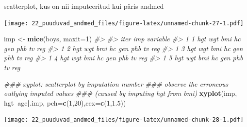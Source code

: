 \documentclass[]{book}
\newenvironment{Shaded}{\begin{snugshade}}{\end{snugshade}}
\newcommand{\CommentTok}[1]{\textcolor[rgb]{0.56,0.35,0.01}{\textit{#1}}}
\newcommand{\DataTypeTok}[1]{\textcolor[rgb]{0.13,0.29,0.53}{#1}}
\newcommand{\DecValTok}[1]{\textcolor[rgb]{0.00,0.00,0.81}{#1}}
\newcommand{\FloatTok}[1]{\textcolor[rgb]{0.00,0.00,0.81}{#1}}
\newcommand{\KeywordTok}[1]{\textcolor[rgb]{0.13,0.29,0.53}{\textbf{#1}}}
\newcommand{\NormalTok}[1]{#1}
\newcommand{\OperatorTok}[1]{\textcolor[rgb]{0.81,0.36,0.00}{\textbf{#1}}}
\newcommand{\StringTok}[1]{\textcolor[rgb]{0.31,0.60,0.02}{#1}}
\begin{document}
scatterplot, kus on nii imputeeritud kui päris andmed

\begin{Shaded}
\end{Shaded}

\texttt{[image: 22\_puuduvad\_andmed\_files/figure-latex/unnamed-chunk-27-1.pdf]}

\begin{Shaded}
\begin{Highlighting}[]
\NormalTok{imp <-}\StringTok{ }\KeywordTok{mice}\NormalTok{(boys, }\DataTypeTok{maxit=}\DecValTok{1}\NormalTok{)}
\CommentTok{#> }
\CommentTok{#>  iter imp variable}
\CommentTok{#>   1   1  hgt  wgt  bmi  hc  gen  phb  tv  reg}
\CommentTok{#>   1   2  hgt  wgt  bmi  hc  gen  phb  tv  reg}
\CommentTok{#>   1   3  hgt  wgt  bmi  hc  gen  phb  tv  reg}
\CommentTok{#>   1   4  hgt  wgt  bmi  hc  gen  phb  tv  reg}
\CommentTok{#>   1   5  hgt  wgt  bmi  hc  gen  phb  tv  reg}

\CommentTok{### xyplot: scatterplot by imputation number}
\CommentTok{### observe the erroneous outlying imputed values}
\CommentTok{### (caused by imputing hgt from bmi)}
\KeywordTok{xyplot}\NormalTok{(imp, hgt}\OperatorTok{~}\NormalTok{age}\OperatorTok{|}\NormalTok{.imp, }\DataTypeTok{pch=}\KeywordTok{c}\NormalTok{(}\DecValTok{1}\NormalTok{,}\DecValTok{20}\NormalTok{),}\DataTypeTok{cex=}\KeywordTok{c}\NormalTok{(}\DecValTok{1}\NormalTok{,}\FloatTok{1.5}\NormalTok{))}
\end{Highlighting}
\end{Shaded}

\texttt{[image: 22\_puuduvad\_andmed\_files/figure-latex/unnamed-chunk-28-1.pdf]}
\end{document}
